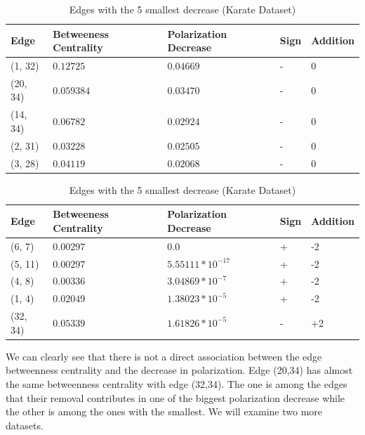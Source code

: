 \begin{table}[!htb]
 \centering
 \caption{Edges with the 5 largest decrease (Karate Dataset)}
 \label{tab:edgesLargest}
 \begin{tabular}{| l || l | l | l | l |}
 \hline
  Edge & Betweeness Centrality & Polarization Decrease & Sign & Addition\\
  \hline
  \hline
  (1, 32) & $0.12725$ & $0.04669$ & - &  0\\
  \hline
  (20, 34) & $0.059384$ & $0.03470$ & - &  0\\
  \hline
  (14, 34) & $0.06782$ & $0.02924$ & - &  0\\
  \hline
  (2, 31) & $0.03228$ & $0.02505$ & - &  0\\
  \hline
  (3, 28) & $0.04119$ & $0.02068$ & - &  0\\
  \hline
 \end{tabular}
 
 \vspace{\floatsep}
 
  \caption{Edges with the 5 smallest decrease (Karate Dataset)}
 \label{tab:edgesLargest}
 \begin{tabular}{| l || l | l | l | l |}
 \hline
  Edge & Betweeness Centrality & Polarization Decrease & Sign & Addition\\
  \hline
  \hline
  (6, 7) & $0.00297$ & $0.0$ & + &  -2\\
  \hline
  (5, 11) & $0.00297$ & $5.55111*10^{-17}$ & + &  -2\\
  \hline
  (4, 8) & $0.00336$ & $3.04869*10^{-7}$ & + &  -2\\
  \hline
  (1, 4) & $0.02049$ & $1.38023*10^{-5}$ & + &  -2\\
  \hline
  (32, 34) & $0.05339$ & $1.61826*10^{-5}$ & - &  +2\\
  \hline
  \hline
 \end{tabular}
 
\end{table}

We can clearly see that there is not a direct association between the edge betweenness centrality and the decrease in polarization. Edge (20,34) has almost the same betweenness centrality with edge (32,34). The one is among the edges that their removal contributes in one of the biggest polarization decrease while the other is among the ones with the smallest. We will examine two more datasets.






